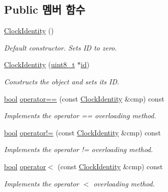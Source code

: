 \subsection*{Public 멤버 함수}
\begin{DoxyCompactItemize}
\item 
\hyperlink{class_clock_identity_ac001966462bfe560f32d05d49a4cf5e7}{Clock\+Identity} ()
\begin{DoxyCompactList}\small\item\em Default constructor. Sets ID to zero. \end{DoxyCompactList}\item 
\hyperlink{class_clock_identity_ac3e3d86b837029b025e5a9b5cd75ecd1}{Clock\+Identity} (\hyperlink{stdint_8h_aba7bc1797add20fe3efdf37ced1182c5}{uint8\+\_\+t} $\ast$\hyperlink{class_clock_identity_a8898dbdfcac5107567fdbf4878c140f9}{id})
\begin{DoxyCompactList}\small\item\em Constructs the object and sets its ID. \end{DoxyCompactList}\item 
\hyperlink{avb__gptp_8h_af6a258d8f3ee5206d682d799316314b1}{bool} \hyperlink{class_clock_identity_a1823c90624aa057ac1b60bf836668477}{operator==} (const \hyperlink{class_clock_identity}{Clock\+Identity} \&cmp) const 
\begin{DoxyCompactList}\small\item\em Implements the operator \textquotesingle{}==\textquotesingle{} overloading method. \end{DoxyCompactList}\item 
\hyperlink{avb__gptp_8h_af6a258d8f3ee5206d682d799316314b1}{bool} \hyperlink{class_clock_identity_a75ece20da752fd2af9a83a650e09ce9c}{operator!=} (const \hyperlink{class_clock_identity}{Clock\+Identity} \&cmp) const 
\begin{DoxyCompactList}\small\item\em Implements the operator \textquotesingle{}!=\textquotesingle{} overloading method. \end{DoxyCompactList}\item 
\hyperlink{avb__gptp_8h_af6a258d8f3ee5206d682d799316314b1}{bool} \hyperlink{class_clock_identity_a3a877768d8833641e3fd476662761251}{operator$<$} (const \hyperlink{class_clock_identity}{Clock\+Identity} \&cmp) const 
\begin{DoxyCompactList}\small\item\em Implements the operator \textquotesingle{}$<$\textquotesingle{} overloading method. \end{DoxyCompactList}\item 

\end{DoxyCompactItemize}
